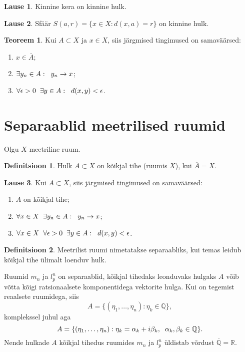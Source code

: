\documentclass{article}[12pt]
\newcommand{\h}{\hspace{0.2cm}}
\newcommand{\R}{\mathbb{R}}
\newcommand{\Q}{\mathbb{Q}}
\theoremstyle{definition}
\newtheorem{definition}{Definitsioon}[section]
\theoremstyle{definition}
\newtheorem{theorem}{Teoreem}[section]
\theoremstyle{definition}
\newtheorem{lause}{Lause}[section]
\theoremstyle{break}
\begin{document}
\begin{lause}
	Kinnine kera on kinnine hulk.
\end{lause}

\begin{lause}
	Sfäär $S(a,r)=\{ x\in X:d(x,a) = r \}$ on kinnine hulk.
\end{lause}

\begin{theorem}
	Kui $A\subset X$ ja $x\in X$, siis järgmised tingimused on samaväärsed:
	\begin{enumerate}
		\item $x\in \overline{A}$;
		\item $\exists y_n\in A:\h y_n\rightarrow x$;
		\item $\forall \epsilon > 0 \h \exists y\in A:\h d(x,y)<\epsilon$.
	\end{enumerate}
\end{theorem}

\section{Separaablid meetrilised ruumid}

Olgu $X$ meetriline ruum.
\begin{definition}
	Hulk $A\subset X$ on kõikjal tihe (ruumis $X$), kui $\overline{A} = X$.
\end{definition}

\begin{lause}
	Kui $A\subset X$, siis järgmised tingimused on samaväärsed:
	\begin{enumerate}
		\item $A$ on kõikjal tihe;
		\item $\forall x\in X\h\exists y_n\in A:\h y_n\rightarrow x$;
		\item $\forall x\in X\h\forall \epsilon > 0 \h \exists y\in A:\h d(x,y)<\epsilon$.
	\end{enumerate}
\end{lause}

\begin{definition}
	Meetrilist ruumi nimetatakse separaabliks, kui temas leidub kõikjal tihe ülimalt loenduv hulk.
\end{definition}

Ruumid $m_n$ ja $l_p^n$ on separaablid, kõikjal tihedaks leonduvaks hulgaks $A$ võib võtta kõigi ratsionaalsete komponentidega vektorite hulga.
Kui on tegemist reaalsete ruumidega, siis
\[
	A=\{ (\eta_1,\dots, \eta_n):\eta_k\in\Q \},
\]
komplekssel juhul aga
\[
	A=\{ (\eta_1,\dots, \eta_n):\eta_k = \alpha_k + i\beta_k,\h \alpha_k, \beta_k\in\Q \}.
\]
Nende hulkade $A$ kõikjal tihedus ruumides $m_n$ ja $l_p^n$ üldistab võrdust $\overline{\Q} = \R$.
\end{document}

